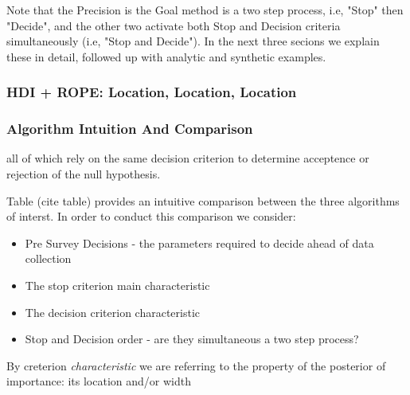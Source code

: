 Note that the Precision is the Goal method is a two step process, 
i.e, "Stop" then "Decide",
and the other two activate both Stop and Decision criteria simultaneously
(i.e, "Stop and Decide"). In the next three secions we explain these in detail,
followed up with analytic and synthetic examples.


\subsubsection{HDI + ROPE: Location, Location, Location}

\subsubsection{Algorithm Intuition And Comparison}

all of which rely on the same decision criterion to determine acceptence
or rejection of the null hypothesis.


Table (cite table) provides an intuitive comparison between the three algorithms of interst.
In order to conduct this comparison we consider:
\begin{itemize}
    \item Pre Survey Decisions - the parameters required to decide ahead of data
    collection
    \item The stop criterion main characteristic 
    \item The decision criterion characteristic
    \item Stop and Decision order - are they simultaneous a two step process?
\end{itemize}
By creterion {\it characteristic} we are referring to the property of the posterior of
importance: its location and/or width



   
